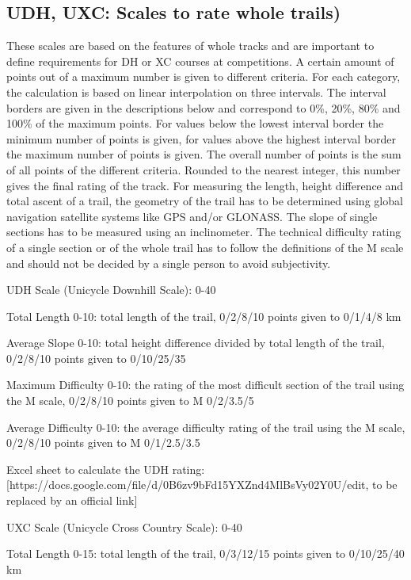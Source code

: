 \subsection{UDH, UXC: Scales to rate whole trails)}

These scales are based on the features of whole tracks and are important to
define requirements for DH or XC courses at competitions. A certain amount of
points out of a maximum number is given to different criteria. For each
category, the calculation is based on linear interpolation on three intervals.
The interval borders are given in the descriptions below and correspond to 0\%,
20\%, 80\% and 100\% of the maximum points. For values below the lowest interval
border the minimum number of points is given, for values above the highest
interval border the maximum number of points is given. The overall number of
points is the sum of all points of the different criteria. Rounded to the
nearest integer, this number gives the final rating of the track. For measuring
the length, height difference and total ascent of a trail, the geometry of the
trail has to be determined using global navigation satellite systems like GPS
and/or GLONASS. The slope of single sections has to be measured using an
inclinometer. The technical difficulty rating of a single section or of the
whole trail has to follow the definitions of the M scale and should not be
decided by a single person to avoid subjectivity.

UDH Scale (Unicycle Downhill Scale): 0-40

Total Length 0-10: total length of the trail, 0/2/8/10 points given to 0/1/4/8 km

Average Slope 0-10: total height difference divided by total length of the trail, 0/2/8/10 points given to 0/10/25/35%

Maximum Difficulty 0-10: the rating of the most difficult section of the trail using the M scale, 0/2/8/10 points given to M 0/2/3.5/5

Average Difficulty 0-10: the average difficulty rating of the trail using the M scale, 0/2/8/10 points given to M 0/1/2.5/3.5

Excel sheet to calculate the UDH rating: [https://docs.google.com/file/d/0B6zv9bFd15YXZnd4MlBsVy02Y0U/edit, to be replaced by an official link]

UXC Scale (Unicycle Cross Country Scale): 0-40

Total Length 0-15: total length of the trail, 0/3/12/15 points given to 0/10/25/40 km

